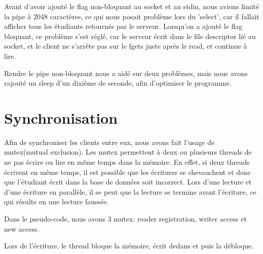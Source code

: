 \documentclass[utf8]{article}
\begin{document}
\begin{large}
Avant d'avoir ajouté le flag non-bloquant au socket et au stdin, nous avions
limité la pipe à 2048 caractères, ce qui nous posait problème lors du 'select',
car il fallait afficher tous les étudiants retournés par le serveur. Lorsqu'on a
ajouté le flag bloquant, ce problème s'est réglé, car le serveur écrit dans le
file descriptor lié au socket, et le client ne s'arrête pas sur le fgets juste
après le read, et continue à lire.
\par
Rendre le pipe non-bloquant nous a aidé sur deux problèmes, mais nous avons
rajouté un sleep d'un dixième de seconde, afin d'optimiser le programme.
\par

\section{Synchronisation}
\par
\indent

Afin de synchroniser les clients entre eux, nous avons fait l'usage de
mutex(mutual exclusion). Les mutex permettent à deux ou plusieurs threads de ne
pas écrire ou lire en même temps dans la mémoire. En effet, si deux threads
écrivent en même temps, il est possible que les écritures se chevauchent et donc
que l'étudiant écrit dans la base de données soit incorrect. Lors d'une lecture
et d'une écriture en parallèle, il se peut que la lecture se termine avant
l'écriture, ce qui résulte en une lecture faussée.
\par
Dans le pseudo-code, nous avons 3 mutex: reader registration, writer access et
new access. 
\par

Lors de l'écriture, le thread bloque la mémoire, écrit dedans et puis la débloque.


\end{large}
\end{document}
